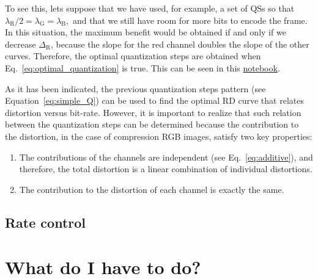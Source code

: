 To see this, lets suppose that we have used, for example, a set of QSs
so that $\lambda_{\text{R}}/2 = \lambda_{\text{G}} =
\lambda_{\text{B}},$ and that we still have room for more bits to
encode the frame. In this situation, the maximum benefit would be
obtained if and only if we decrease $\Delta_{\text{R}}$, because the
slope for the red channel doubles the slope of the other
curves. Therefore, the optimal quantization steps are obtained when
Eq.~\ref{eq:optimal_quantization} is true. This can be seen in this
\href{https://github.com/Sistemas-Multimedia/Sistemas-Multimedia.github.io/blob/master/milestones/05-RGB_compression/RGB_compression.ipynb}{notebook}.

As it has been indicated, the previous quantization steps pattern (see
Equation~\ref{eq:simple_Q}) can be used to find the optimal RD curve
that relates distortion versus bit-rate. However, it is important to
realize that such relation between the quantization steps can be
determined because the contribution to the distortion, in the case of
compression RGB images, satisfy two key properties:
\begin{enumerate}
\item The contributions of the channels are independent (see
  Eq.~\ref{eq:additive}), and therefore, the total distortion is a
  linear combination of individual distortions.
\item The contribution to the distortion of each channel is exactly
  the same.
\end{enumerate}


\subsection{Rate control}



\section{What do I have to do?}

